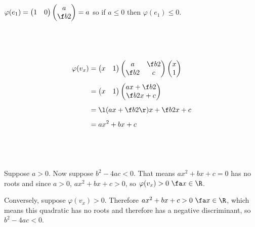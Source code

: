 \documentclass[a4paper]{article}
\begin{document}
\subsection{~}

$\varphi(e_1) = \begin{pmatrix}1 & 0\end{pmatrix} \begin{pmatrix}a \\ \f b2\end{pmatrix} = a$ so if $a \le 0$ then $\varphi(e_1) \le 0$.

\subsection{~}

\begin{align*}
\varphi(v_x) &= \begin{pmatrix}x & 1\end{pmatrix} \begin{pmatrix}a & \f b2 \\ \f b2 & c\end{pmatrix} \begin{pmatrix}x \\ 1\end{pmatrix}\\[1ex]
&= \begin{pmatrix}x & 1\end{pmatrix} \begin{pmatrix}ax + \f b2 \\ \f b2 x + c\end{pmatrix}\\[1ex]
&= \l(ax + \f b2\r)x + \f b2 x + c\\[1ex]
&= ax^2 + bx + c
\end{align*}

\subsection{~}

Suppose $a > 0$. Now suppose $b^2 - 4ac < 0$. That means $ax^2 + bx + c = 0$ has no roots and since $a > 0$, $ax^2 + bx + c > 0$, so $\varphi(v_x) > 0\ \fa x \in \R$.

Conversely, suppose $\varphi(v_x) > 0$. Therefore $ax^2 + bx + c > 0\ \fa x \in \R$, which means this quadratic has no roots and therefore has a negative discriminant, so $b^2 - 4ac < 0$.


\end{document}
